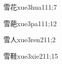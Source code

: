 \begin{verbete}{雪花}{xue3hua1}{11;7}
\end{verbete}

\begin{verbete}{雪葩}{xue3pa1}{11;12}
\end{verbete}

\begin{verbete}{雪人}{xue3ren2}{11;2}
\end{verbete}

\begin{verbete}{雪鞋}{xue3xie2}{11;15}
\end{verbete}


